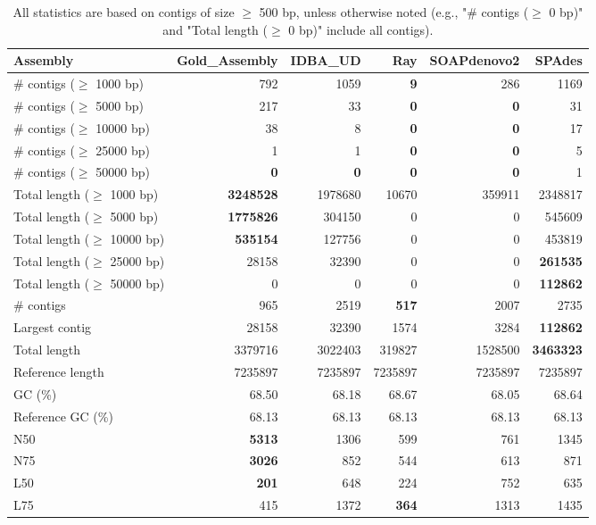 \documentclass[12pt,a4paper]{article}
\begin{document}
\begin{table}[ht]
\begin{center}
\caption{All statistics are based on contigs of size $\geq$ 500 bp, unless otherwise noted (e.g., "\# contigs ($\geq$ 0 bp)" and "Total length ($\geq$ 0 bp)" include all contigs).}
\begin{tabular}{|l*{5}{|r}|}
\hline
Assembly & Gold\_Assembly & IDBA\_UD & Ray & SOAPdenovo2 & SPAdes \\ \hline
\# contigs ($\geq$ 1000 bp) & 792 & 1059 & {\bf 9} & 286 & 1169 \\ \hline
\# contigs ($\geq$ 5000 bp) & 217 & 33 & {\bf 0} & {\bf 0} & 31 \\ \hline
\# contigs ($\geq$ 10000 bp) & 38 & 8 & {\bf 0} & {\bf 0} & 17 \\ \hline
\# contigs ($\geq$ 25000 bp) & 1 & 1 & {\bf 0} & {\bf 0} & 5 \\ \hline
\# contigs ($\geq$ 50000 bp) & {\bf 0} & {\bf 0} & {\bf 0} & {\bf 0} & 1 \\ \hline
Total length ($\geq$ 1000 bp) & {\bf 3248528} & 1978680 & 10670 & 359911 & 2348817 \\ \hline
Total length ($\geq$ 5000 bp) & {\bf 1775826} & 304150 & 0 & 0 & 545609 \\ \hline
Total length ($\geq$ 10000 bp) & {\bf 535154} & 127756 & 0 & 0 & 453819 \\ \hline
Total length ($\geq$ 25000 bp) & 28158 & 32390 & 0 & 0 & {\bf 261535} \\ \hline
Total length ($\geq$ 50000 bp) & 0 & 0 & 0 & 0 & {\bf 112862} \\ \hline
\# contigs & 965 & 2519 & {\bf 517} & 2007 & 2735 \\ \hline
Largest contig & 28158 & 32390 & 1574 & 3284 & {\bf 112862} \\ \hline
Total length & 3379716 & 3022403 & 319827 & 1528500 & {\bf 3463323} \\ \hline
Reference length & 7235897 & 7235897 & 7235897 & 7235897 & 7235897 \\ \hline
GC (\%) & 68.50 & 68.18 & 68.67 & 68.05 & 68.64 \\ \hline
Reference GC (\%) & 68.13 & 68.13 & 68.13 & 68.13 & 68.13 \\ \hline
N50 & {\bf 5313} & 1306 & 599 & 761 & 1345 \\ \hline
N75 & {\bf 3026} & 852 & 544 & 613 & 871 \\ \hline
L50 & {\bf 201} & 648 & 224 & 752 & 635 \\ \hline
L75 & 415 & 1372 & {\bf 364} & 1313 & 1435 \\ \hline

\end{tabular}
\end{center}
\end{table}
\end{document}
